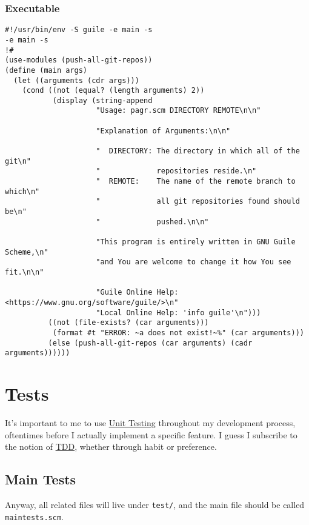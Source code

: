 \documentclass[11pt]{article}
\begin{document}
\subsubsection{Executable}
\label{sec:org3b2fdc1}
\begin{verbatim}
#!/usr/bin/env -S guile -e main -s
-e main -s
!#
(use-modules (push-all-git-repos))
(define (main args)
  (let ((arguments (cdr args)))
    (cond ((not (equal? (length arguments) 2))
           (display (string-append
                     "Usage: pagr.scm DIRECTORY REMOTE\n\n"

                     "Explanation of Arguments:\n\n"

                     "  DIRECTORY: The directory in which all of the git\n"
                     "             repositories reside.\n"
                     "  REMOTE:    The name of the remote branch to which\n"
                     "             all git repositories found should be\n"
                     "             pushed.\n\n"

                     "This program is entirely written in GNU Guile Scheme,\n"
                     "and You are welcome to change it how You see fit.\n\n"

                     "Guile Online Help: <https://www.gnu.org/software/guile/>\n"
                     "Local Online Help: 'info guile'\n")))
          ((not (file-exists? (car arguments)))
           (format #t "ERROR: ~a does not exist!~%" (car arguments)))
          (else (push-all-git-repos (car arguments) (cadr arguments))))))

\end{verbatim}

\section{Tests}
\label{sec:org614c5e9}
It's important to me to use \href{https://en.wikipedia.org/wiki/Unit\_testing}{Unit Testing} throughout my development process,
oftentimes before I actually implement a specific feature. I guess I subscribe
to the notion of \href{https://en.wikipedia.org/wiki/Test-driven\_development}{TDD}, whether through habit or preference.

\subsection{Main Tests}
\label{sec:orgee6af68}
Anyway, all related files will live under \texttt{test/}, and the main file should be
called \texttt{maintests.scm}.
\end{document}
